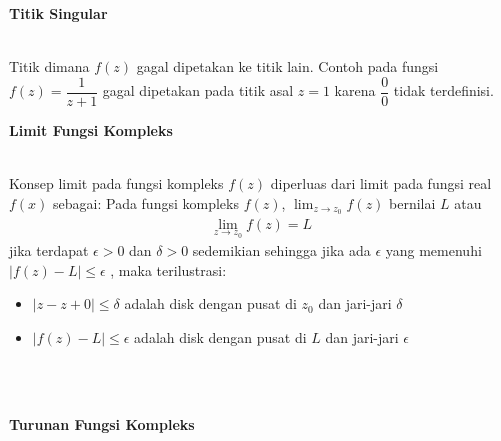 \documentclass{article}
\begin{document}
    \begin{center}
        \textbf{Titik Singular}
    \end{center}
    \leavevmode\\

    Titik dimana $f(z)$ gagal dipetakan ke titik lain. Contoh pada fungsi \\ $f(z) = \dfrac{1}{z+1}$ gagal dipetakan pada titik asal $z=1$ karena $\dfrac{0}{0}$ tidak terdefinisi.

    \newpage
    \begin{center}
        \textbf{Limit Fungsi Kompleks}
    \end{center}
    \leavevmode\\

    Konsep limit pada fungsi kompleks $f(z)$ diperluas dari limit pada fungsi real $f(x)$ sebagai:
    Pada fungsi kompleks $f(z)$, $\lim_{z \to z_0} f(z)$ bernilai $L$ atau
    \begin{align}
        \lim_{z \to z_0} f(z) = L
    \end{align}
    jika terdapat $\epsilon  > 0$ dan $\delta  > 0$ sedemikian sehingga jika ada $\epsilon$ yang memenuhi $|f(z) - L| \leq \epsilon$ , maka terilustrasi:
    \begin{itemize}
        \item $|z - z+0| \leq \delta$ adalah disk dengan pusat di $z_0$ dan jari-jari $\delta$
        \item $|f(z) - L| \leq \epsilon$ adalah disk dengan pusat di $L$ dan jari-jari $\epsilon$
    \end{itemize}
    \leavevmode\\ \\

    \begin{center}
        \textbf{Turunan Fungsi Kompleks}
    \end{center}
    \leavevmode\\
\end{document}
